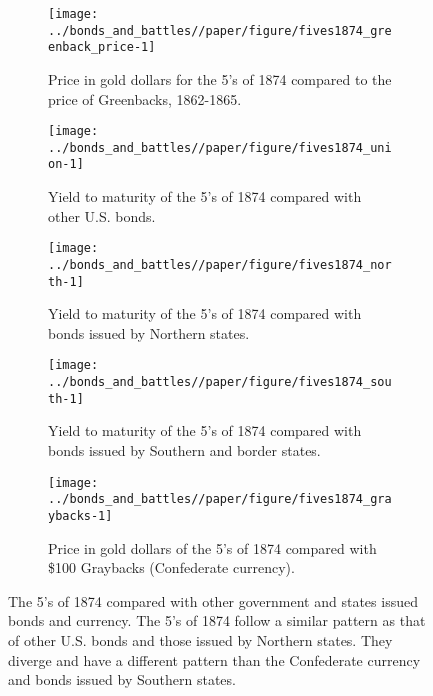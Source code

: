 \begin{figure}[!]
  \begin{subfigure}[b]{0.45\linewidth}
    \texttt{[image: ../bonds\_and\_battles//paper/figure/fives1874\_greenback\_price-1]}
  \caption{Price in gold dollars for the 5's of 1874 compared to the price of Greenbacks, 1862-1865.}
  \label{bonds_battles:fig:fives1874_greenbacks}
\end{subfigure}%
\hspace{0.1\linewidth}%
\begin{subfigure}[b]{0.45\linewidth}
    \texttt{[image: ../bonds\_and\_battles//paper/figure/fives1874\_union-1]}
  \caption{Yield to maturity of the 5's of 1874 compared with other U.S. bonds.}
  \label{bonds_battles:fig:fives1874_union}
\end{subfigure}

\begin{subfigure}[b]{0.45\linewidth}
  \centering
  \texttt{[image: ../bonds\_and\_battles//paper/figure/fives1874\_north-1]}
\caption{Yield to maturity of the 5's of 1874 compared with bonds issued by Northern states.}
\label{bonds_battles:fig:fives1874_north}
\end{subfigure}%
\hspace{0.1\linewidth}%
\begin{subfigure}[b]{0.45\linewidth}
  \texttt{[image: ../bonds\_and\_battles//paper/figure/fives1874\_south-1]}
\caption{Yield to maturity of the 5's of 1874 compared with bonds issued by Southern and border states.}
\label{bonds_battles:fig:fives1874_south}
\end{subfigure}

\begin{subfigure}[b]{0.45\linewidth}
  \texttt{[image: ../bonds\_and\_battles//paper/figure/fives1874\_graybacks-1]}
\caption{Price in gold dollars of the 5's of 1874 compared with \$100 Graybacks (Confederate currency).}
\label{bonds_battles:fig:fives1874_grayback}

\end{subfigure}
\caption[The 5's of 1874 compared with other government and states issued bonds and currency.]{The 5's of 1874 compared with other government and states issued bonds and currency.
  The 5's of 1874 follow a similar pattern as that of other U.S. bonds and those issued by Northern states.
  They diverge and have a different pattern than the Confederate currency and bonds issued by Southern states.
}
\label{bonds_battles:fig:fives1874_compared}
\end{figure}



